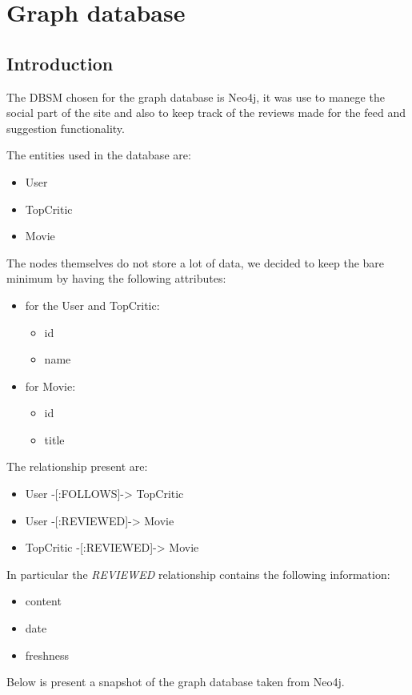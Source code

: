 %
%
\chapter{Graph database}
\section{Introduction}
\justifying
The DBSM chosen for the graph database is Neo4j, it was use to manege the social part of the site and also to keep track of the reviews made for the feed and suggestion functionality.


The entities used in the database are:
\begin{itemize}
	\item User
	\item TopCritic
	\item Movie
\end{itemize}
The nodes themselves do not store a lot of data, we decided to keep the bare minimum by having the following attributes:
\begin{itemize}
	\item for the User and TopCritic:
	\begin{itemize}
		\item id
		\item name
	\end{itemize}
	\item for Movie:
	\begin{itemize}
		\item id
		\item title
	\end{itemize}
\end{itemize}
The relationship present are:
\begin{itemize}
	\item User -[:FOLLOWS]-> TopCritic
	\item User -[:REVIEWED]-> Movie
	\item TopCritic -[:REVIEWED]-> Movie
\end{itemize}
In particular the \emph{REVIEWED} relationship contains the following information:
\begin{itemize}
	\item content
	\item date
	\item freshness
\end{itemize}

Below is present a snapshot of the graph database taken from Neo4j.

